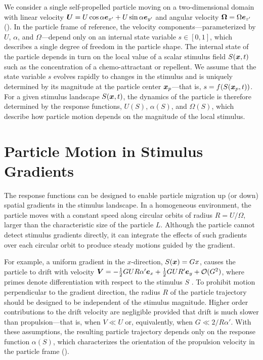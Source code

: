 We consider a single self-propelled particle moving on a two-dimensional domain with linear velocity $\boldsymbol{U}=U\cos\alpha \boldsymbol{e}_{x'} + U\sin\alpha \boldsymbol{e}_{y'}$ and angular velocity $\boldsymbol{\Omega}=\Omega \boldsymbol{e}_{z'}$ (). In the particle frame of reference, the velocity components---parameterized by $U$, $\alpha$, and $\Omega$---depend only on an internal state variable $s\in[0,1]$, which describes a single degree of freedom in the particle shape.  The internal state of the particle depends in turn on the local value of a scalar stimulus field $S(\boldsymbol{x},t)$ such as the concentration of a chemo-attractant or repellent.  We assume that the state variable $s$ evolves rapidly to changes in the stimulus and is uniquely determined by its magnitude at the particle center $\boldsymbol{x}_p$---that is, $s=f(S(\boldsymbol{x}_p,t))$. For a given stimulus landscape $S(\boldsymbol{x},t)$, the dynamics of the particle is therefore determined by the response functions, $U(S)$, $\alpha(S)$, and $\Omega(S)$, which describe how particle motion depends on the magnitude of the local stimulus.

\section{Particle Motion in Stimulus Gradients} %
The response functions can be designed to enable particle migration up (or down) spatial gradients in the stimulus landscape. In a homogeneous environment, the particle moves with a constant speed along circular orbits of radius $R=U/\Omega$, larger than the characteristic size of the particle $L$.  Although the particle cannot detect stimulus gradients directly, it can integrate the effects of such gradients over each circular orbit to produce steady motions guided by the gradient. 

For example, a uniform gradient in the $x$-direction, $S(\boldsymbol{x})=G x$, causes the particle to drift with velocity $\boldsymbol{V}=-\tfrac{1}{2}G U R \alpha' \boldsymbol{e}_x + \tfrac{1}{2}G U R' \boldsymbol{e}_y + \mathcal{O}(G^2)$, where primes denote differentiation with respect to the stimulus $S$ \autocite{Supp}. To prohibit motion perpendicular to the gradient direction, the radius $R$ of the particle trajectory should be designed to be independent of the stimulus magnitude. Higher order contributions to the drift velocity are negligible provided that drift is much slower than propulsion---that is, when $V\ll U$ or, equivalently, when $G\ll 2/R\alpha'$. With these assumptions, the resulting particle trajectory depends only on the response function $\alpha(S)$, which characterizes the orientation of the propulsion velocity in the particle frame ().

